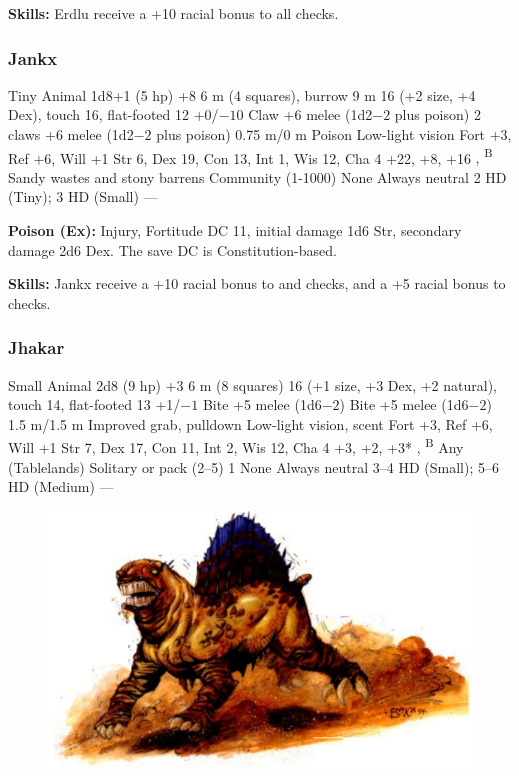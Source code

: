 \textbf{Skills:} Erdlu receive a +10 racial bonus to all  checks.

\subsubsection{Jankx}
\begin{MonsterStats}
{Tiny Animal}
{1d8+1 (5 hp)}
{+8}
{6 m (4 squares), burrow 9 m}
{16 (+2 size, +4 Dex), touch 16, flat-footed 12}
{+0/$-10$}
{Claw +6 melee (1d2$-2$ plus poison)}
{2 claws +6 melee (1d2$-2$ plus poison)}
{0.75 m/0 m}
{Poison}
{Low-light vision}
{Fort +3, Ref +6, Will +1}
{Str 6, Dex 19, Con 13, Int 1, Wis 12, Cha 4}
{ +22,  +8,  +16}
{, \textsuperscript{B}}
{Sandy wastes and stony barrens}
{Community (1-1000)}
{\onehalf}
{None}
{Always neutral}
{2 HD (Tiny); 3 HD (Small)}
{---}
\end{MonsterStats}

\textbf{Poison (Ex):} Injury, Fortitude DC 11, initial damage 1d6 Str, secondary damage 2d6 Dex. The save DC is Constitution-based.

\textbf{Skills:} Jankx receive a +10 racial bonus to  and  checks, and a +5 racial bonus to  checks.

\subsubsection{Jhakar}
\begin{MonsterStats}
{Small Animal}
{2d8 (9 hp)}
{+3}
{6 m (8 squares)}
{16 (+1 size, +3 Dex, +2 natural), touch 14, flat-footed 13}
{+1/$-1$}
{Bite +5 melee (1d6$-2$)}
{Bite +5 melee (1d6$-2$)}
{1.5 m/1.5 m}
{Improved grab, pulldown}
{Low-light vision, scent}
{Fort +3, Ref +6, Will +1}
{Str 7, Dex 17, Con 11, Int 2, Wis 12, Cha 4}
{ +3,  +2,  +3*}
{, \textsuperscript{B}}
{Any (Tablelands)}
{Solitary or pack (2--5)}
{1}
{None}
{Always neutral}
{3--4 HD (Small); 5--6 HD (Medium)}
{---}
\end{MonsterStats}

\begin{figure}[t!]
\centering
\includegraphics[width=\textwidth]{images/jhakar.png}
\WOTC
\end{figure}

